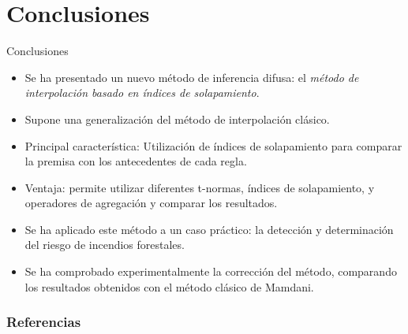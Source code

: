 \documentclass{beamer}
\begin{document}
\section{Conclusiones}
\begin{frame}{Conclusiones}
	\begin{itemize}
	\item Se ha presentado un nuevo método de inferencia difusa: el \emph{método de interpolación basado en índices de solapamiento}.
	\item Supone una generalización del método de interpolación clásico.
	\item Principal característica: Utilización de índices de solapamiento para comparar la premisa con los antecedentes de cada regla.
	\item Ventaja: permite utilizar diferentes t-normas, índices de solapamiento, y operadores de agregación y comparar los resultados.
	\item Se ha aplicado este método a un caso práctico: la detección y determinación del riesgo de incendios forestales.
	\item Se ha comprobado experimentalmente la corrección del método, comparando los resultados obtenidos con el método clásico de Mamdani.
	\end{itemize}
\end{frame}

\begin{frame}
	\frametitle{Referencias}
   { }
    
\end{frame}
\end{document}
